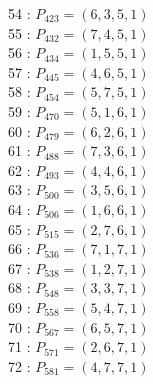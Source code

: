 \documentclass{article}
\begin{document}
{\begin{multicols}{3}
54 : $P_{423}=( 6, 3, 5, 1 )$\\
55 : $P_{432}=( 7, 4, 5, 1 )$\\
56 : $P_{434}=( 1, 5, 5, 1 )$\\
57 : $P_{445}=( 4, 6, 5, 1 )$\\
58 : $P_{454}=( 5, 7, 5, 1 )$\\
59 : $P_{470}=( 5, 1, 6, 1 )$\\
60 : $P_{479}=( 6, 2, 6, 1 )$\\
61 : $P_{488}=( 7, 3, 6, 1 )$\\
62 : $P_{493}=( 4, 4, 6, 1 )$\\
63 : $P_{500}=( 3, 5, 6, 1 )$\\
64 : $P_{506}=( 1, 6, 6, 1 )$\\
65 : $P_{515}=( 2, 7, 6, 1 )$\\
66 : $P_{536}=( 7, 1, 7, 1 )$\\
67 : $P_{538}=( 1, 2, 7, 1 )$\\
68 : $P_{548}=( 3, 3, 7, 1 )$\\
69 : $P_{558}=( 5, 4, 7, 1 )$\\
70 : $P_{567}=( 6, 5, 7, 1 )$\\
71 : $P_{571}=( 2, 6, 7, 1 )$\\
72 : $P_{581}=( 4, 7, 7, 1 )$\\
\end{multicols}


%


%


}%
\end{document}
